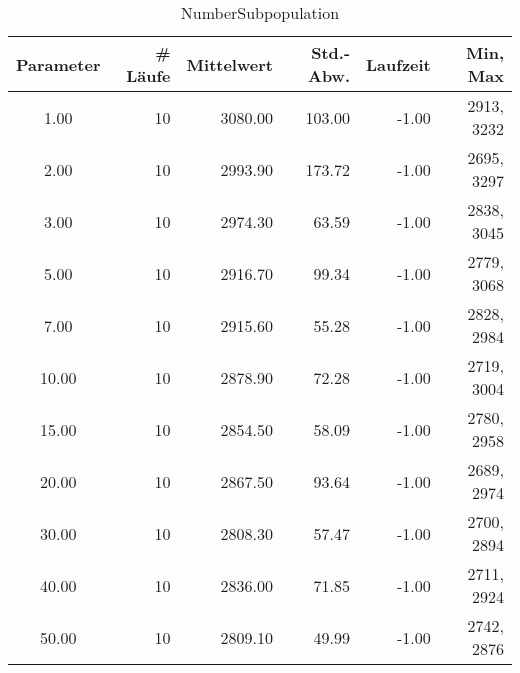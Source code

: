 \begin{table}[tbp]
\begin{tabular}{ | c || r | r | r | r | r | }
\hline
Parameter & \# Läufe & Mittelwert & Std.-Abw. & Laufzeit & Min, Max \\
\hline
   1.00 &  10 & 3080.00 &  103.00 &   -1.00 & 2913, 3232 \\
   2.00 &  10 & 2993.90 &  173.72 &   -1.00 & 2695, 3297 \\
   3.00 &  10 & 2974.30 &   63.59 &   -1.00 & 2838, 3045 \\
   5.00 &  10 & 2916.70 &   99.34 &   -1.00 & 2779, 3068 \\
   7.00 &  10 & 2915.60 &   55.28 &   -1.00 & 2828, 2984 \\
  10.00 &  10 & 2878.90 &   72.28 &   -1.00 & 2719, 3004 \\
  15.00 &  10 & 2854.50 &   58.09 &   -1.00 & 2780, 2958 \\
  20.00 &  10 & 2867.50 &   93.64 &   -1.00 & 2689, 2974 \\
  30.00 &  10 & 2808.30 &   57.47 &   -1.00 & 2700, 2894 \\
  40.00 &  10 & 2836.00 &   71.85 &   -1.00 & 2711, 2924 \\
  50.00 &  10 & 2809.10 &   49.99 &   -1.00 & 2742, 2876 \\
\hline
\end{tabular}
\caption{NumberSubpopulation}\label{NumberSubpopulation}
\end{table}


